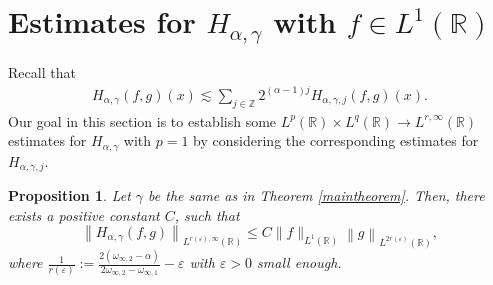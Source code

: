 \documentclass[11pt, twoside, leqno]{article}
\newtheorem{proposition}[theorem]{Proposition}
\theoremstyle{definition}
\numberwithin{equation}{section}
\begin{document}
\section{Estimates for $H_{\alpha,\gamma}$ with $f\in L^1(\mathbb{R})$}

Recall that
\begin{align}\label{eq:4.1}
H_{\alpha,\gamma}(f,g)(x)\lesssim \sum_{j \in \mathbb{Z}}2^{(\alpha-1)j}H_{\alpha,\gamma,j}(f,g)(x).
\end{align}
Our goal in this section is to establish some $L^p(\mathbb{R})\times L^q(\mathbb{R}) \rightarrow L^{r,\infty}(\mathbb{R})$ estimates for $H_{\alpha,\gamma}$ with $p=1$ by considering the corresponding estimates for $H_{\alpha,\gamma,j}$.

\begin{proposition}\label{proposition 4.1}
Let $\gamma $ be the same as in Theorem \ref{maintheorem}. Then, there exists a positive constant $C$, such that
$$\left\|H_{\alpha,\gamma}(f,g)\right\|_{L^{r(\varepsilon),\infty}(\mathbb{R})}\leq C \|f\|_{L^{1}(\mathbb{R})}\left\|g\right\|_{L^{2r(\varepsilon)}(\mathbb{R})},$$
where $\frac{1}{r( \varepsilon ) }:=\frac{2(\omega_{\infty,2}-\alpha)}{2\omega_{\infty,2}-\omega_{\infty,1}}-\varepsilon $ with $\varepsilon>0$ small enough.
\end{proposition}
\end{document}
